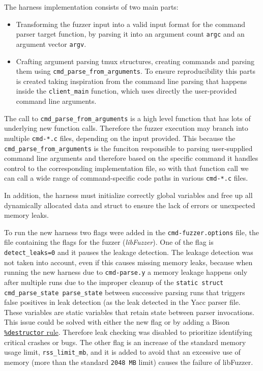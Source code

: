 \documentclass[11pt,a4paper,twocolumn]{article}
\begin{document}
The harness implementation consists of two main parts:
\begin{itemize}
    \item Transforming the fuzzer input into a valid input format for the command parser target function, by parsing it into an argument count \texttt{argc} and an argument vector \texttt{argv}.
    \item Crafting argument parsing tmux structures, creating commands and parsing them using \texttt{cmd\_parse\_from\_arguments}. To ensure reproducibility this parts is created taking inspiration from the command line parsing that happens inside the \texttt{client\_main} function, which uses directly the user-provided command line arguments. 

\end{itemize}
The call to \texttt{cmd\_parse\_from\_arguments} is a high level function that has lots of underlying new function calls. Therefore the fuzzer execution may branch into multiple \texttt{cmd-*.c} files, depending on the input provided. This because the \texttt{cmd\_parse\_from\_arguments} is the funciton responsible to parsing user-supplied command line arguments and therefore based on the specific command it handles control to the corresponding implementation file, so with that function call we can call a wide range of command-specific code paths in various \texttt{cmd-*.c} files.

In addition, the harness must initialize correctly global variables and free up all dynamically allocated data and struct to ensure the lack of errors or unexpected memory leaks.

To run the new harness two flags were added in the \texttt{cmd-fuzzer.options} file, the file containing the flags for the fuzzer (\textit{libFuzzer}). One of the flag is \texttt{detect\_leaks=0} and it pauses the leakage detection. The leakage detection was not taken into account, even if this causes missing memory leaks, because when running the new harness due to \texttt{cmd-parse.y} a memory leakage happens only after multiple runs due to the improper cleanup of the \texttt{static struct cmd\_parse\_state parse\_state} between successive parsing runs that triggers false positives in leak detection (as the leak detected in the Yacc parser file. These variables are static variables that retain state between parser invocations. This issue could be solved with either the new flag or by adding a Bison \href{https://www.gnu.org/software/bison/manual/html_node/Destructor-Decl.html}{\texttt{\%destructor} rule}.
Therefore leak checking was disabled to prioritize identifying critical crashes or bugs.
The other flag is an increase of the standard memory usage limit, \texttt{rss\_limit\_mb}, and it is added to avoid that an excessive use of memory (more than the standard \texttt{2048 MB} limit) causes the failure of libFuzzer.
\end{document}

